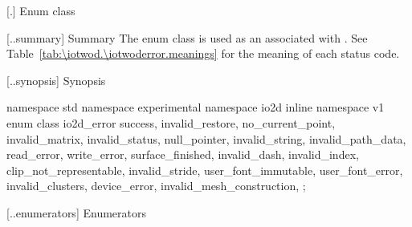  [\iotwod.\iotwoderror] {Enum class }

 [\iotwod.\iotwoderror.summary] { Summary}
\pnum
The  enum class is used as an  
associated with . See 
Table~\ref{tab:\iotwod.\iotwoderror.meanings} for the meaning of each
status code.

 [\iotwod.\iotwoderror.synopsis] { Synopsis}

\begin{codeblock}
namespace std { namespace experimental { namespace io2d { inline namespace v1 {
  enum class io2d_error {
    success,
    invalid_restore,
    no_current_point,
    invalid_matrix,
    invalid_status,
    null_pointer,
    invalid_string,
    invalid_path_data,
    read_error,
    write_error,
    surface_finished,
    invalid_dash,
    invalid_index,
    clip_not_representable,
    invalid_stride,
    user_font_immutable,
    user_font_error,
    invalid_clusters,
    device_error,
    invalid_mesh_construction,
  };
} } } }
\end{codeblock}

 [\iotwod.\iotwoderror.enumerators] { Enumerators}

